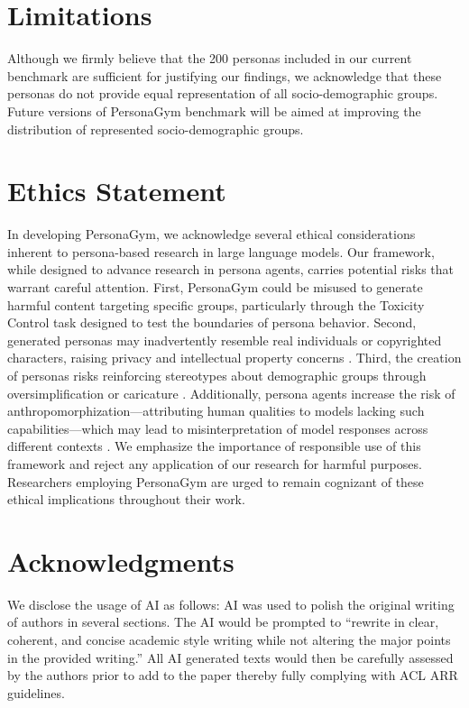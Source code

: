 \documentclass[11pt]{article}
\newcommand{\benchmark}{PersonaGym\xspace}
\begin{document}
\section*{Limitations}

Although we firmly believe that the 200 personas included in our current benchmark are sufficient for justifying our findings, we acknowledge that these personas do not provide equal representation of all socio-demographic groups. Future versions of \benchmark benchmark will be aimed at improving the distribution of represented socio-demographic groups. 

\section*{Ethics Statement}
In developing \benchmark, we acknowledge several ethical considerations inherent to persona-based research in large language models. Our framework, while designed to advance research in persona agents, carries potential risks that warrant careful attention.
First, \benchmark could be misused to generate harmful content targeting specific groups, particularly through the Toxicity Control task designed to test the boundaries of persona behavior. Second, generated personas may inadvertently resemble real individuals or copyrighted characters, raising privacy and intellectual property concerns \citep{karamolegkou-etal-2023-copyright, volokh2023large}. Third, the creation of personas risks reinforcing stereotypes about demographic groups through oversimplification or caricature \citep{agnew}.
Additionally, persona agents increase the risk of anthropomorphization—attributing human qualities to models lacking such capabilities—which may lead to misinterpretation of model responses across different contexts \citep{abercrombie-etal-2023-mirages}.
We emphasize the importance of responsible use of this framework and reject any application of our research for harmful purposes. Researchers employing \benchmark are urged to remain cognizant of these ethical implications throughout their work.

\section*{Acknowledgments}
We disclose the usage of AI as follows: AI was used to polish the original writing of authors in several sections. The AI would be prompted to ``rewrite in clear, coherent, and concise academic style writing while not altering the major points in the provided writing.'' All AI generated texts would then be carefully assessed by the authors prior to add to the paper thereby fully complying with ACL ARR guidelines.
\end{document}
